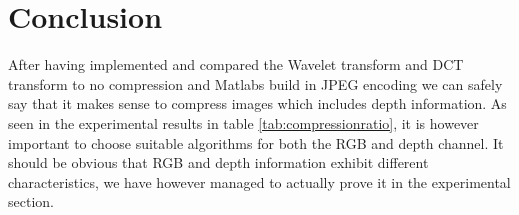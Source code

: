 \section{Conclusion}\label{sec:future}

After having implemented and compared the Wavelet transform and DCT transform to no compression and Matlabs build in JPEG encoding we can safely say that it makes sense to compress images which includes depth information. As seen in the experimental results in table \ref{tab:compressionratio}, it is however important to choose suitable algorithms for both the RGB and depth channel. It should be obvious that RGB and depth information exhibit different characteristics, we have however managed to actually prove it in the experimental section. 